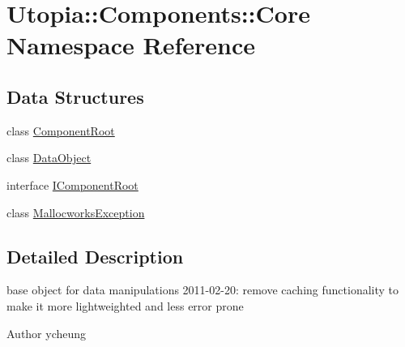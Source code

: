 \hypertarget{namespace_utopia_1_1_components_1_1_core}{
\section{Utopia::Components::Core Namespace Reference}
\label{namespace_utopia_1_1_components_1_1_core}
}
\subsection*{Data Structures}
\begin{DoxyCompactItemize}
\item 
class \hyperlink{class_utopia_1_1_components_1_1_core_1_1_component_root}{ComponentRoot}
\item 
class \hyperlink{class_utopia_1_1_components_1_1_core_1_1_data_object}{DataObject}
\item 
interface \hyperlink{interface_utopia_1_1_components_1_1_core_1_1_i_component_root}{IComponentRoot}
\item 
class \hyperlink{class_utopia_1_1_components_1_1_core_1_1_mallocworks_exception}{MallocworksException}
\end{DoxyCompactItemize}


\subsection{Detailed Description}
base object for data manipulations 2011-\/02-\/20: remove caching functionality to make it more lightweighted and less error prone \begin{DoxyAuthor}{Author}
ycheung 
\end{DoxyAuthor}
